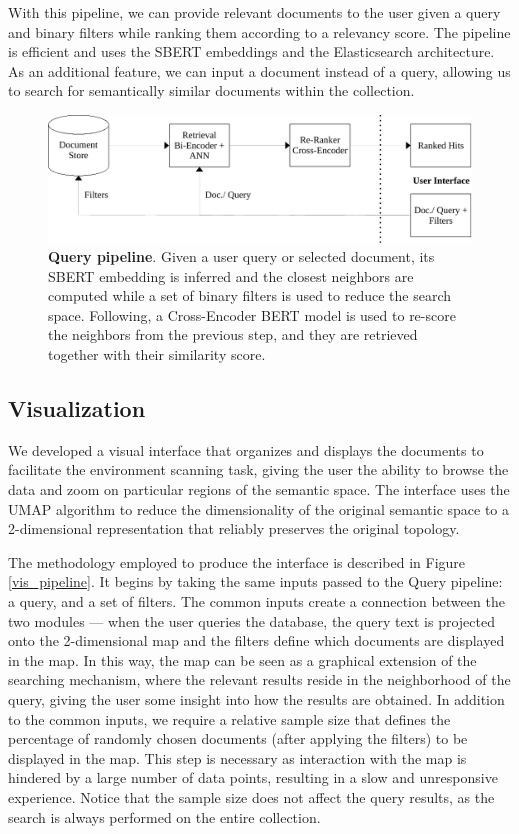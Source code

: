 \documentclass[a4paper]{article}
\begin{document}
With this pipeline, we can provide relevant documents to the user given a query and binary filters while ranking them according to a relevancy score. The pipeline is efficient and uses the SBERT embeddings and the Elasticsearch architecture. As an additional feature, we can input a document instead of a query, allowing us to search for semantically similar documents within the collection.

\begin{figure}[H]
	\centering
	\includegraphics[scale=0.7]{./assets/query_pipeline}
	\caption{\textbf{Query pipeline}. Given a user query or selected document, its SBERT embedding is inferred and the closest neighbors are computed while a set of binary filters is used to reduce the search space. Following, a Cross-Encoder BERT model is used to re-score the neighbors from the previous step, and they are retrieved together with their similarity score.}
	\label{query_pipeline}
\end{figure}

\subsection{Visualization}
We developed a visual interface that organizes and displays the documents to facilitate the environment scanning task, giving the user the ability to browse the data and zoom on particular regions of the semantic space. The interface uses the UMAP algorithm to reduce the dimensionality of the original semantic space to a 2-dimensional representation that reliably preserves the original topology.

The methodology employed to produce the interface is described in Figure \ref{vis_pipeline}. It begins by taking the same inputs passed to the Query pipeline: a query, and a set of filters. The common inputs create a connection between the two modules — when the user queries the database, the query text is projected onto the 2-dimensional map and the filters define which documents are displayed in the map. In this way, the map can be seen as a graphical extension of the searching mechanism, where the relevant results reside in the neighborhood of the query, giving the user some insight into how the results are obtained. In addition to the common inputs, we require a relative sample size that defines the percentage of randomly chosen documents (after applying the filters) to be displayed in the map. This step is necessary as interaction with the map is hindered by a large number of data points, resulting in a slow and unresponsive experience. Notice that the sample size does not affect the query results, as the search is always performed on the entire collection.
\end{document}
